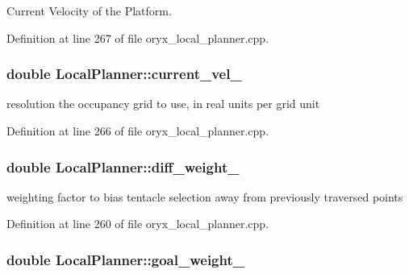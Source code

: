 \-Current \-Velocity of the \-Platform. 



\-Definition at line 267 of file oryx\-\_\-local\-\_\-planner.\-cpp.

\subsubsection[{current\-\_\-vel\-\_\-}]{\setlength{\rightskip}{0pt plus 5cm}double {\bf \-Local\-Planner\-::current\-\_\-vel\-\_\-}\hspace{0.3cm}{\ttfamily  [private]}}\label{classLocalPlanner_a054b4da9ce90665b04a7e7b609672b5a}


resolution the occupancy grid to use, in real units per grid unit 



\-Definition at line 266 of file oryx\-\_\-local\-\_\-planner.\-cpp.

\subsubsection[{diff\-\_\-weight\-\_\-}]{\setlength{\rightskip}{0pt plus 5cm}double {\bf \-Local\-Planner\-::diff\-\_\-weight\-\_\-}\hspace{0.3cm}{\ttfamily  [private]}}\label{classLocalPlanner_ab54f1e68f375ec0dbf96eca2c6f0a14d}


weighting factor to bias tentacle selection away from previously traversed points 



\-Definition at line 260 of file oryx\-\_\-local\-\_\-planner.\-cpp.

\subsubsection[{goal\-\_\-weight\-\_\-}]{\setlength{\rightskip}{0pt plus 5cm}double {\bf \-Local\-Planner\-::goal\-\_\-weight\-\_\-}\hspace{0.3cm}{\ttfamily  [private]}}\label{classLocalPlanner_a5c93ab12f5722cfe56f363a00fa1d781}


